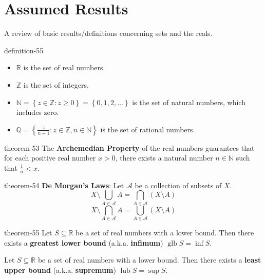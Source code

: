 \documentclass[10pt,]{article}
\newcommand{\terminology}[1]{\textbf{#1}}
\newcommand{\mb}{\mathbb}
\newcommand{\mc}{\mathcal}
\newcommand{\glb}{\operatorname{glb}}
\newcommand{\lub}{\operatorname{lub}}
\newcommand{\setBuilder}[2]{\left\{#1:#2\right\}}
\newcommand{\setList}[1]{\left\{#1\right\}}
\newcommand{\lt}{<}
\begin{document}
\section[{Assumed Results}]{Assumed Results}\label{set-theory}
\hypertarget{p-205}{}%
A review of basic results/definitions concerning sets and the reals.%
\begin{definition}{}{definition-55}%
\leavevmode%
\begin{itemize}[label=\textbullet]
\item{}\(\mb R\) is the set of real numbers.%
\item{}\(\mb Z\) is the set of integers.%
\item{}\(\mb N=\setBuilder{z\in\mb Z}{z\geq 0}=\setList{0,1,2,\dots}\) is the set of natural numbers, which includes zero.%
\item{}\(\mb Q=\setBuilder{\frac{z}{n+1}}{z\in\mb Z,n\in\mb N}\) is the set of rational numbers.%
\end{itemize}
\end{definition}
\begin{theorem}{}{}{theorem-53}%
\hypertarget{p-206}{}%
The \terminology{Archemedian Property} of the real numbers guarantees that for each positive real number \(x>0\), there exists a natural number \(n\in\mb N\) such that \(\frac{1}{n}\lt x\).%
\end{theorem}
\begin{theorem}{}{}{theorem-54}%
\hypertarget{p-207}{}%
\terminology{De Morgan's Laws}: Let \(\mc A\) be a collection of subsets of \(X\).%
%
\begin{equation*}
X\setminus\bigcup_{A\in\mc A}A=\bigcap_{A\in\mc A}(X\setminus A)
\end{equation*}
%
\begin{equation*}
X\setminus\bigcap_{A\in\mc A}A=\bigcup_{A\in\mc A}(X\setminus A)
\end{equation*}
\end{theorem}
\begin{theorem}{}{}{theorem-55}%
\hypertarget{p-208}{}%
Let \(S\subseteq \mb R\) be a set of real numbers with a lower bound. Then there exists a \terminology{greatest lower bound} (a.k.a. \terminology{infimum}) \(\glb S=\inf S\).%
\par
\hypertarget{p-209}{}%
Let \(S\subseteq \mb R\) be a set of real numbers with a lower bound. Then there exists a \terminology{least upper bound} (a.k.a. \terminology{supremum}) \(\lub S=\sup S\).%
\end{theorem}
\end{document}
